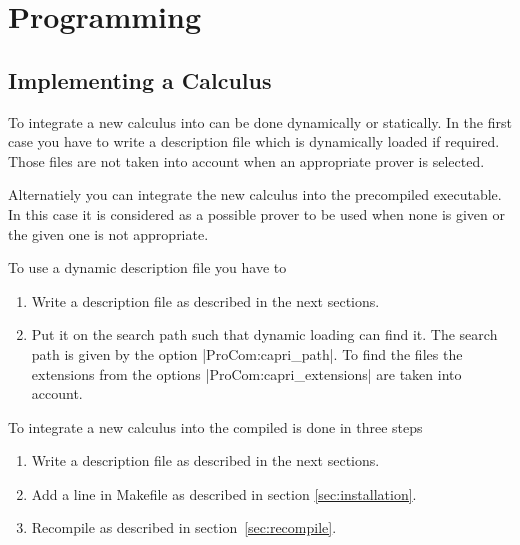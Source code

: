 
\chapter{Programming \ProCom}




\section{Implementing a Calculus}

To integrate a new calculus into \ProCom{} can be done dynamically or
statically. In the first case you have to write a \CaPrI{} description file
which is dynamically loaded if required. Those files are not taken into
account when an appropriate prover is selected.

Alternatiely you can integrate the new calculus into the precompiled \ProCom{}
executable. In this case it is considered as a possible prover to be used when
none is given or the given one is not appropriate.

To use a dynamic \CaPrI{} description file you have to
\begin{enumerate}
  \item Write a description file as described in the next sections.
  \item Put it on the search path such that dynamic loading can find it.
    The search path is given by the option |ProCom:capri_path|. To find the
    files the extensions from the options |ProCom:capri_extensions| are taken
    into account.
\end{enumerate}


To integrate a new calculus into the compiled \ProCom{} is done in three steps
\begin{enumerate}
  \item Write a description file as described in the next sections.
  \item Add a line in {\sf Makefile} as described in section
    \ref{sec:installation}.
  \item Recompile \ProCom{} as described in section~\ref{sec:recompile}.
\end{enumerate}



